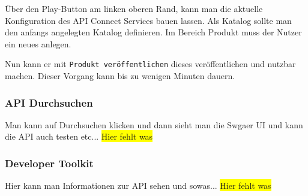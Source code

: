 Über den Play-Button am linken oberen Rand, kann man die aktuelle Konfiguration des API Connect Services bauen lassen.
Als Katalog sollte man den anfangs angelegten Katalog definieren. Im Bereich Produkt muss der Nutzer ein neues anlegen.

Nun kann er mit \texttt{Produkt veröffentlichen} dieses veröffentlichen und nutzbar machen. Dieser Vorgang kann bis zu
wenigen Minuten dauern.

\subsubsection{API Durchsuchen}
Man kann auf Durchsuchen klicken und dann sieht man die Swgaer UI und kann die API auch testen etc...
\colorbox{yellow}{Hier fehlt was}

\subsubsection{Developer Toolkit}
Hier kann man Informationen zur API sehen und sowas...
\colorbox{yellow}{Hier fehlt was}